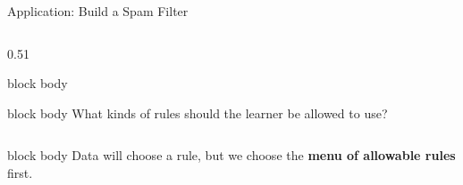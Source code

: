 \documentclass[aspectratio=169,10pt]{beamer}
\begin{document}
\begin{frame}[t]{Application: Build a Spam Filter}
\begin{columns}[T,totalwidth=\textwidth]
\begin{column}{0.51\textwidth}
\begin{beamercolorbox}[rounded=true,sep=0.23cm,wd=\linewidth]{block body}
\begin{itemize}
        \end{itemize}
        \vspace{0.05cm}
        \begin{beamercolorbox}[rounded=true,sep=0.13cm,wd=0.96\linewidth,center]{block body}
          \normalsize What kinds of rules should the learner be allowed to use?
        \end{beamercolorbox}
      \end{beamercolorbox}
    \end{column}
  \end{columns}
  \vspace{0.18cm}
  \begin{beamercolorbox}[rounded=true,sep=0.18cm,wd=0.94\linewidth,center]{block body}
    \centering
    Data will choose a rule, but we choose the \textbf{menu of allowable rules} first.
  \end{beamercolorbox}
\end{frame}
\end{document}
